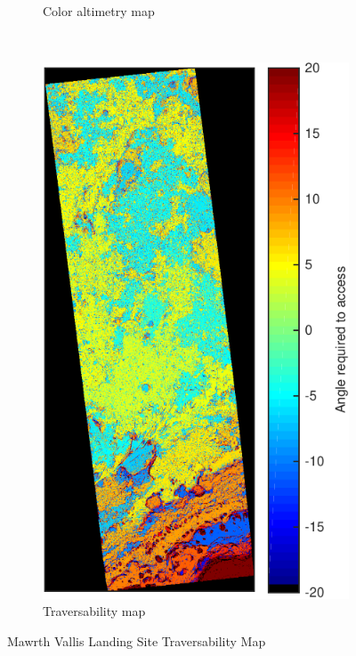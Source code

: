 \documentclass[12pt]{article}
\begin{document}
\begin{figure}[h!]
\begin{subfigure}[t]{0.35\textwidth}
    \caption{Color altimetry map}
    \label{fig:gale_dtm}
  \end{subfigure}
  ~
  \begin{subfigure}[t]{0.35\textwidth}
    \centering
    \includegraphics[height=0.4\paperheight]{figures/maps/ESP_023957_1755/DTEEC_023957_1755_024023_1755_U01-traversability_map.pdf}
    \caption{Traversability map}
    \label{fig:gale_traversability}
  \end{subfigure}
  \caption{Mawrth Vallis Landing Site Traversability Map}
  \label{fig:gale}
\end{figure}
\end{document}
